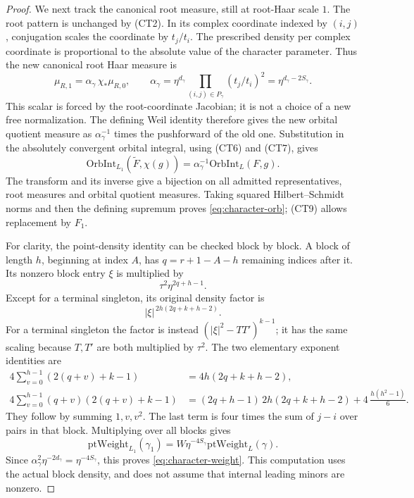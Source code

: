 \begin{proof}
We next track the canonical root measure, still at
root-Haar scale \(1\). The root pattern is unchanged by
(CT2). In its complex coordinate indexed by \((i,j)\),
conjugation scales the coordinate by \(t_j/t_i\).
The prescribed density per complex coordinate is
proportional to the absolute value of the character
parameter. Thus the new canonical root Haar measure is
\[
 \mu_{R,1}
      =\alpha_\gamma\,\chi_*\mu_{R,0},\qquad
 \alpha_\gamma
      =\eta^{d_\gamma}
           \prod_{(i,j)\in P_\gamma}(t_j/t_i)^2
      =\eta^{d_\gamma-2S_\gamma}.
                                                        \tag{CT10}
\]
This scalar is forced by the root-coordinate Jacobian;
it is not a choice of a new free normalization.
The defining Weil identity therefore gives the new
orbital quotient measure as
\(\alpha_\gamma^{-1}\) times the pushforward of the old one.
Substitution in the absolutely convergent orbital integral,
using (CT6) and (CT7), gives
\[
       \mathrm{OrbInt}_{L_1}(\widetilde F,\chi(g))
             =\alpha_\gamma^{-1}\mathrm{OrbInt}_L(F,g).
                                                        \tag{CT11}
\]
The transform and its inverse give a bijection on all
admitted representatives, root measures and orbital quotient
measures. Taking squared Hilbert--Schmidt norms and then
the defining supremum proves \eqref{eq:character-orb};
(CT9) allows replacement by \(F_1\).

For clarity, the point-density identity can be checked
block by block. A block of length \(h\), beginning at
index \(A\), has \(q=r+1-A-h\) remaining indices after it.
Its nonzero block entry \(\xi\) is multiplied by
\[
                  \tau^2\eta^{2q+h-1}.
\]
Except for a terminal singleton, its original density
factor is
\[
                 |\xi|^{\,2h(2q+k+h-2)}.
\]
For a terminal singleton the factor is instead
\((|\xi|^2-TT')^{k-1}\); it has the same scaling
because \(T,T'\) are both multiplied by \(\tau^2\).
The two elementary exponent identities are
\[
 \begin{split}
 4\sum_{v=0}^{h-1}(2(q+v)+k-1)
       &=4h(2q+k+h-2),\\
 4\sum_{v=0}^{h-1}(q+v)(2(q+v)+k-1)
       &=(2q+h-1)\,2h(2q+k+h-2)
                  +4\,\frac{h(h^2-1)}6 .
 \end{split}                                           \tag{CT12}
\]
They follow by summing \(1,v,v^2\).
The last term is four times the sum of \(j-i\) over
pairs in that block. Multiplying over all blocks gives
\[
       \mathrm{ptWeight}_{L_1}(\gamma_1)
                =W\eta^{-4S_\gamma}
                                \mathrm{ptWeight}_L(\gamma).
                                                        \tag{CT13}
\]
Since
\(\alpha_\gamma^2\eta^{-2d_\gamma}=\eta^{-4S_\gamma}\),
this proves \eqref{eq:character-weight}. This computation
uses the actual block density, and does not assume that
internal leading minors are nonzero.


\end{proof}
